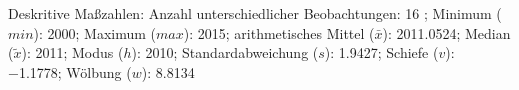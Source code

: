 				\label{tableValues:mres032b}
				\vspace*{-\baselineskip}
                    \begin{noten}
                	    \note{} Deskritive Maßzahlen:
                	    Anzahl unterschiedlicher Beobachtungen: 16%
                	    ; 
                	      Minimum ($min$): 2000; 
                	      Maximum ($max$): 2015; 
                	      arithmetisches Mittel ($\bar{x}$): \num[round-mode=places,round-precision=2]{2011,0524}; 
                	      Median ($\tilde{x}$): 2011; 
                	      Modus ($h$): 2010; 
                	      Standardabweichung ($s$): \num[round-mode=places,round-precision=2]{1,9427}; 
                	      Schiefe ($v$): \num[round-mode=places,round-precision=2]{-1,1778}; 
                	      Wölbung ($w$): \num[round-mode=places,round-precision=2]{8,8134}
                     \end{noten}


